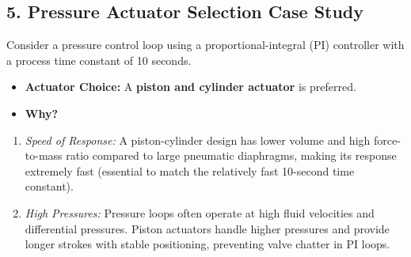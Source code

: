 \subsection{5. Pressure Actuator Selection Case Study}
Consider a pressure control loop using a proportional-integral (PI) controller with a process time constant of 10 seconds.
\begin{itemize}
  \item   \textbf{Actuator Choice:} A \textbf{piston and cylinder actuator} is preferred.
  \item   \textbf{Why?}
\end{itemize}
\begin{enumerate}
  \item \textit{Speed of Response:} A piston-cylinder design has lower volume and high force-to-mass ratio compared to large pneumatic diaphragms, making its response extremely fast (essential to match the relatively fast 10-second time constant).
  \item \textit{High Pressures:} Pressure loops often operate at high fluid velocities and differential pressures. Piston actuators handle higher pressures and provide longer strokes with stable positioning, preventing valve chatter in PI loops.
\end{enumerate}


